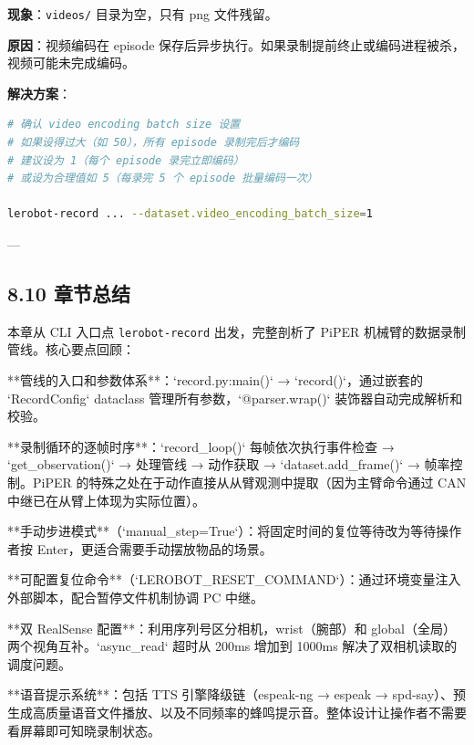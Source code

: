 \documentclass[UTF8,a4paper,11pt]{ctexart}
\begin{document}
{\textbf{现象}：\texttt{videos/} 目录为空，只有 png 文件残留。

\textbf{原因}：视频编码在 episode 保存后异步执行。如果录制提前终止或编码进程被杀，视频可能未完成编码。

\textbf{解决方案}：
\begin{lstlisting}[language=bash]
# 确认 video encoding batch size 设置
# 如果设得过大（如 50），所有 episode 录制完后才编码
# 建议设为 1（每个 episode 录完立即编码）
# 或设为合理值如 5（每录完 5 个 episode 批量编码一次）

lerobot-record ... --dataset.video_encoding_batch_size=1
\end{lstlisting}

---

\subsection{8.10 章节总结}

本章从 CLI 入口点 \texttt{lerobot-record} 出发，完整剖析了 PiPER 机械臂的数据录制管线。核心要点回顾：

\item[1] **管线的入口和参数体系**：`record.py:main()` → `record()`，通过嵌套的 `RecordConfig` dataclass 管理所有参数，`@parser.wrap()` 装饰器自动完成解析和校验。

\item[2] **录制循环的逐帧时序**：`record_loop()` 每帧依次执行事件检查 → `get_observation()` → 处理管线 → 动作获取 → `dataset.add_frame()` → 帧率控制。PiPER 的特殊之处在于动作直接从从臂观测中提取（因为主臂命令通过 CAN 中继已在从臂上体现为实际位置）。

\item[3] **手动步进模式**（`manual_step=True`）：将固定时间的复位等待改为等待操作者按 Enter，更适合需要手动摆放物品的场景。

\item[4] **可配置复位命令**（`LEROBOT_RESET_COMMAND`）：通过环境变量注入外部脚本，配合暂停文件机制协调 PC 中继。

\item[5] **双 RealSense 配置**：利用序列号区分相机，wrist（腕部）和 global（全局）两个视角互补。`async_read` 超时从 200ms 增加到 1000ms 解决了双相机读取的调度问题。

\item[6] **语音提示系统**：包括 TTS 引擎降级链（espeak-ng → espeak → spd-say）、预生成高质量语音文件播放、以及不同频率的蜂鸣提示音。整体设计让操作者不需要看屏幕即可知晓录制状态。

}
\end{document}
